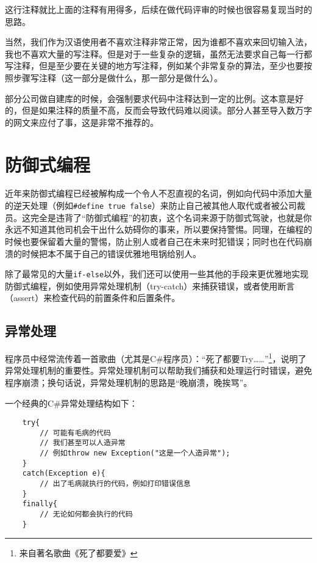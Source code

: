 \documentclass[../main.tex]{subfiles}
\begin{document}
这行注释就比上面的注释有用得多，后续在做代码评审的时候也很容易复现当时的思路。

当然，我们作为汉语使用者不喜欢注释非常正常，因为谁都不喜欢来回切输入法，我也不喜欢大量的写注释。但是对于一些复杂的逻辑，虽然无法要求自己每一行都写注释，但是至少要在关键的地方写注释，例如某个非常复杂的算法，至少也要按照步骤写注释（这一部分是做什么，那一部分是做什么）。

\begin{note}
  部分公司做自建库的时候，会强制要求代码中注释达到一定的比例。这本意是好的，但是如果注释的质量不高，反而会导致代码难以阅读。部分人甚至导入数万字的网文来应付了事，这是非常不推荐的。
\end{note}

\section{防御式编程}

近年来防御式编程已经被解构成一个令人不忍直视的名词，例如向代码中添加大量的逆天处理（例如\texttt{\#define true false}）来防止自己被其他人取代或者被公司裁员。这完全是违背了“防御式编程”的初衷，这个名词来源于防御式驾驶，也就是你永远不知道其他司机会干出什么妨碍你的事来，所以要保持警惕。同理，在编程的时候也要保留着大量的警惕，防止别人或者自己在未来时犯错误；同时也在代码崩溃的时候把本不属于自己的错误优雅地甩锅给别人。

除了最常见的大量\texttt{if-else}以外，我们还可以使用一些其他的手段来更优雅地实现防御式编程，例如使用异常处理机制（try-catch）来捕获错误，或者使用断言（assert）来检查代码的前置条件和后置条件。

\subsection{异常处理}

程序员中经常流传着一首歌曲（尤其是C\#程序员）：“死了都要Try……”\footnote{来自著名歌曲《死了都要爱》}，说明了异常处理机制的重要性。异常处理机制可以帮助我们捕获和处理运行时错误，避免程序崩溃；换句话说，异常处理机制的思路是“晚崩溃，晚挨骂”。

一个经典的C\#异常处理结构如下：
\begin{lstlisting}
    try{
        // 可能有毛病的代码
        // 我们甚至可以人造异常
        // 例如throw new Exception("这是一个人造异常");
    }
    catch(Exception e){
        // 出了毛病就执行的代码，例如打印错误信息
    }
    finally{
        // 无论如何都会执行的代码
    }
\end{lstlisting}
\end{document}
